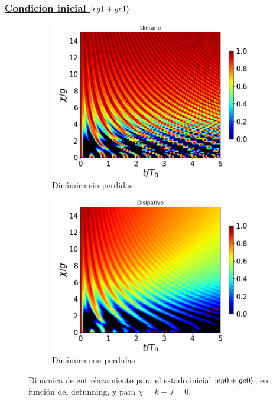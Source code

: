 \subsubsection{\underline{Condicion inicial $\ket{eg1+ge1}$}}
\begin{figure}[h]
    \centering
    \begin{subfigure}{0.49\textwidth}
        \includegraphics[width=\textwidth]{figuras/ch4/concu/chi/eg1+ge1 d=0.0g k=0.0g J=0.0g gamma=0.25g concu chi uni.png}
        \caption{Dinámica sin perdidas}
        \label{fig4:concu x 1 uni}
    \end{subfigure}
    \hfill
    \begin{subfigure}{0.49\textwidth}
        \includegraphics[width=\textwidth]{figuras/ch4/concu/chi/eg1+ge1 d=0.0g k=0.0g J=0.0g gamma=0.25g concu chi dis.png}
        \caption{Dinámica con perdidas}
        \label{fig4:concu x 1 dis}
    \end{subfigure}
    \caption{Dinámica de entrelazamiento para el estado inicial $\ket{eg0+ge0}$, en función del detunning, y para $\chi=k-J=0$.}
    \label{fig4:concu x 1}
\end{figure}
